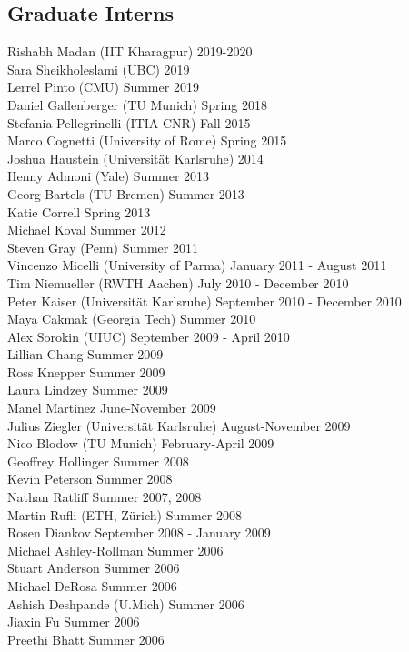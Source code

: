 \subsection{Graduate Interns}
\noindent
Rishabh Madan (IIT Kharagpur) \hfill 2019-2020\\
Sara Sheikholeslami (UBC) \hfill 2019\\
Lerrel Pinto (CMU) \hfill Summer 2019\\
Daniel Gallenberger (TU Munich) \hfill Spring 2018\\
Stefania Pellegrinelli (ITIA-CNR) \hfill Fall 2015\\
Marco Cognetti (University of Rome) \hfill Spring 2015\\
Joshua Haustein (Universit\"at Karlsruhe) \hfill 2014\\
Henny Admoni (Yale) \hfill Summer 2013\\
Georg Bartels (TU Bremen) \hfill Summer 2013\\
Katie Correll  \hfill Spring 2013\\
Michael Koval  \hfill Summer 2012\\
Steven Gray (Penn) \hfill Summer 2011\\
Vincenzo Micelli (University of Parma) \hfill January 2011 - August 2011\\
Tim Niemueller (RWTH Aachen) \hfill July 2010 - December 2010\\ 
Peter Kaiser (Universit\"at Karlsruhe) \hfill September 2010 - December 2010\\ 
Maya Cakmak (Georgia Tech) \hfill Summer 2010\\ 
Alex Sorokin (UIUC) \hfill September 2009 - April 2010\\ 
Lillian Chang  \hfill Summer 2009\\
Ross Knepper  \hfill Summer 2009\\
Laura Lindzey  \hfill Summer 2009\\
Manel Martinez  \hfill June-November 2009\\
Julius Ziegler (Universit\"at Karlsruhe) \hfill August-November 2009\\
Nico Blodow (TU Munich) \hfill February-April 2009\\
Geoffrey Hollinger  \hfill Summer 2008\\
Kevin Peterson  \hfill Summer 2008\\
Nathan Ratliff  \hfill Summer 2007, 2008\\
Martin Rufli (ETH, Z\"urich) \hfill Summer 2008\\
Rosen Diankov  \hfill September 2008 - January 2009\\
Michael Ashley-Rollman  \hfill Summer 2006\\
Stuart Anderson  \hfill Summer 2006\\
Michael DeRosa  \hfill Summer 2006\\
Ashish Deshpande (U.Mich) \hfill Summer 2006\\
Jiaxin Fu  \hfill Summer 2006\\
Preethi Bhatt  \hfill Summer 2006\\

